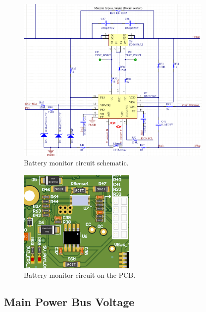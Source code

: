 \begin{figure}[!ht]
    \begin{center}
        \includegraphics[width=0.85\textwidth]{figures/bms-circuit-schematic.png}
        \caption{Battery monitor circuit schematic.}
        \label{fig:bms-circuit-schematic}
    \end{center}
\end{figure}

\begin{figure}[!ht]
    \begin{center}
        \includegraphics[width=0.5\textwidth]{figures/bms-circuit-3d.png}
        \caption{Battery monitor circuit on the PCB.}
        \label{fig:bms-circuit-3d}
    \end{center}
\end{figure}

\subsection{Main Power Bus Voltage}

